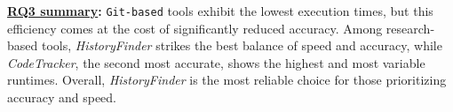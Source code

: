 \begin{tcolorbox}
\noindent\textbf{\underline{RQ3 summary}:}
\texttt{Git-based} tools exhibit the lowest execution times, but this efficiency comes at the cost of significantly reduced accuracy. Among research-based tools, \textit{HistoryFinder} strikes the best balance of speed and accuracy, while \textit{CodeTracker}, the second most accurate, shows the highest and most variable runtimes. Overall, \textit{HistoryFinder} is the most reliable choice for those prioritizing accuracy and speed.
\end{tcolorbox}
